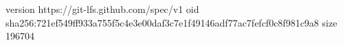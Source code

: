 version https://git-lfs.github.com/spec/v1
oid sha256:721ef549ff933a755f5c4e3e00daf3c7e1f49146adf77ac7fefcf0c8f981c9a8
size 196704
